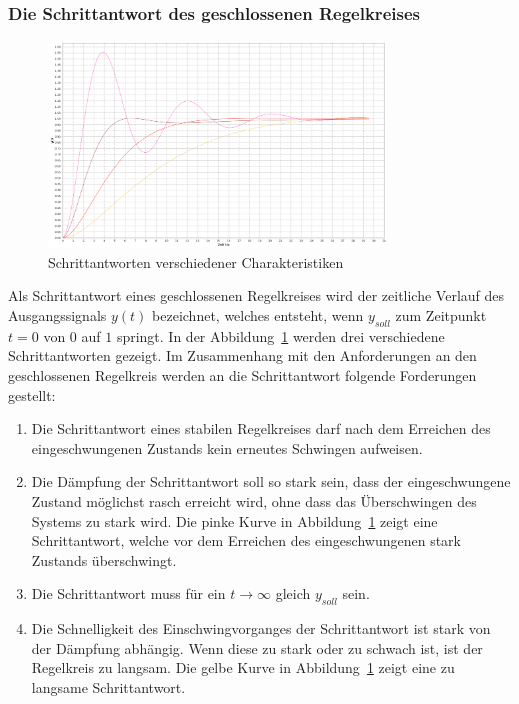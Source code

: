 \subsubsection*{Die Schrittantwort des geschlossenen Regelkreises}

\begin{figure}[h!, width=\pagewidth]
    \begin{center}
    \includegraphics[width=0.8\textwidth]{images/schrittantworten.png}
    \caption{Schrittantworten verschiedener Charakteristiken}
    \label{fig:stepresponse}
    \end{center}
\end{figure}

Als  Schrittantwort  eines  geschlossenen   Regelkreises  wird  der  zeitliche
Verlauf  des   Ausgangssignals  $y(t)$  bezeichnet,  welches   entsteht,  wenn
$y_{soll}$   zum   Zeitpunkt  $t=0$   von   $0$   auf  $1$   springt. In   der
Abbildung~\ref{fig:stepresponse}  werden  drei  verschiedene  Schrittantworten
gezeigt.   Im   Zusammenhang  mit  den  Anforderungen   an  den  geschlossenen
Regelkreis werden an die Schrittantwort folgende Forderungen gestellt:

\begin{enumerate}
    \item
        Die Schrittantwort eines stabilen Regelkreises darf nach dem Erreichen
        des eingeschwungenen Zustands kein erneutes Schwingen aufweisen.
    \item
        Die  D\"ampfung  der  Schrittantwort  soll so  stark  sein,  dass  der
        eingeschwungene  Zustand m\"oglichst  rasch erreicht  wird, ohne  dass
        das  \"Uberschwingen des  Systems zu  stark wird. Die  pinke Kurve  in
        Abbildung~\ref{fig:stepresponse} zeigt eine Schrittantwort, welche vor
        dem Erreichen des eingeschwungenen stark Zustands \"uberschwingt.
    \item
        Die   Schrittantwort  muss   f\"ur  ein   $t\rightarrow\infty$  gleich
        $y_{soll}$ sein.
    \item
        Die  Schnelligkeit  des  Einschwingvorganges  der  Schrittantwort  ist
        stark  von  der  D\"ampfung   abh\"angig. Wenn  diese  zu  stark  oder
        zu   schwach   ist,  ist   der   Regelkreis   zu  langsam. Die   gelbe
        Kurve  in  Abbildung~\ref{fig:stepresponse}  zeigt  eine  zu  langsame
        Schrittantwort.
\end{enumerate}


